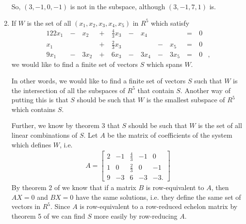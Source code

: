 \documentclass[12pt]{article}
\begin{document}
\begin{enumerate}
      So, $(3,-1,0,-1)$ is not in the subspace, although $(3,-1,7,1)$ is.

    \item
      If $W$ is the set of all $(x_1,x_2,x_3,x_4,x_5)$ in $R^5$ which satisfy
      \begin{alignat*}{12}
        2x_1&\ -\ &  x_2\ & +\ & \frac{4}{3}x_3\ & -\ &  x_4\ &  \ &     \ & =\ & 0&\\
         x_1&   \ &     \ & +\ & \frac{2}{3}x_3\ &  \ &     \ & -\ &  x_5\ & =\ & 0&\\
        9x_1&\ -\ & 3x_2\ & +\ &           6x_3\ & -\ & 3x_4\ & -\ & 3x_5\ & =\ & 0&,
      \end{alignat*}
      we would like to find a finite set of vectors $S$ which spans $W$.

      In other words, we would like to find a finite set of vectors $S$ such that $W$ is
      the intersection of all the subspaces of $R^5$ that contain $S$. Another way of
      putting this is that $S$ should be such that $W$ is the smallest subspace of
      $R^5$ which contains $S$.

      Further, we know by theorem 3 that $S$ should be such that $W$ is the set of
      all linear combinations of $S$. Let $A$ be the matrix of coefficients of the
      system which defines $W$, i.e.
      \begin{align*}
        A =
        \begin{bmatrix}
          2 & -1 & \frac{4}{3} &  -1 &  0 \\
          1 &  0 & \frac{2}{3} &   0 & -1 \\
          9 & -3 &           6 &  -3 & -3.
        \end{bmatrix}
      \end{align*}
      By theorem 2 of  we know that if a matrix $B$ is row-equivalent to
      $A$, then $AX = 0$ and $BX = 0$ have the same solutions, i.e. they define the
      same set of vectors in $R^5$. Since $A$ is row-equivalent to a row-reduced
      echelon matrix by theorem 5 of  we can find $S$ more easily by
      row-reducing $A$.


\end{enumerate}
\end{document}
